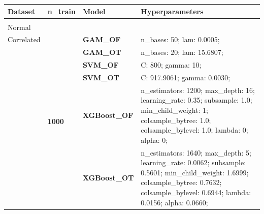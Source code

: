 \documentclass[runningheads]{llncs}
\begin{document}
\begin{table}
    \scriptsize
    \begin{tabularx}{\textwidth}{>{\RaggedRight\arraybackslash}m{1.6cm}p{1.225cm}p{2.05cm}>{\RaggedRight\arraybackslash}X}
        \toprule
        \textbf{Dataset}                        & \textbf{n\_train}                 & \textbf{Model}       & \textbf{Hyperparameters}                                                                                                                                                                          \\
        \midrule
        \multirow[t]{14}{=}{\textbf{Simple                                                                                                                                                                                                                                                                     \\Normal\\Correlated}} & \multirow[t]{7}{*}{\textbf{1000}} & \textbf{GAM\_OF} & n\_bases: 50; lam: 0.0005;  \\
        \textbf{}                               & \textbf{}                         & \textbf{GAM\_OT}     & n\_bases: 20; lam: 15.6807;                                                                                                                                                                       \\
        \textbf{}                               & \textbf{}                         & \textbf{SVM\_OF}     & C: 800; gamma: 10;                                                                                                                                                                                \\
        \textbf{}                               & \textbf{}                         & \textbf{SVM\_OT}     & C: 917.9061; gamma: 0.0030;                                                                                                                                                                       \\
        \textbf{}                               & \textbf{}                         & \textbf{XGBoost\_OF} & n\_estimators: 1200; max\_depth: 16; learning\_rate: 0.35; subsample: 1.0; min\_child\_weight: 1; colsample\_bytree: 1.0; colsample\_bylevel: 1.0; lambda: 0; alpha: 0;                           \\
        \textbf{}                               & \textbf{}                         & \textbf{XGBoost\_OT} & n\_estimators: 1640; max\_depth: 5; learning\_rate: 0.0062; subsample: 0.5601; min\_child\_weight: 1.6999; colsample\_bytree: 0.7632; colsample\_bylevel: 0.6944; lambda: 0.0156; alpha: 0.0660;  \\

\end{tabularx}
\end{table}
\end{document}

